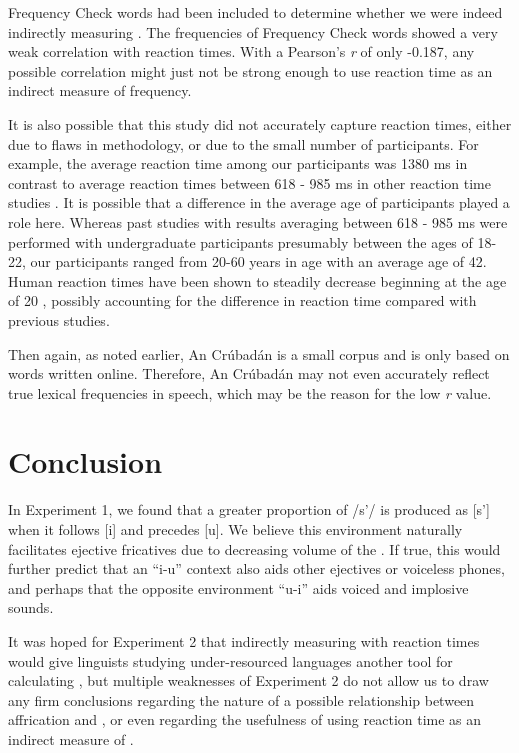 \documentclass[output=paper
,newtxmath
,modfonts
,nonflat]{langsci/langscibook}
\begin{document}
Frequency Check words had been included to determine whether we were indeed indirectly measuring . The frequencies of Frequency Check words showed a very weak correlation with reaction times. With a Pearson’s \textit{r} of only -0.187, any possible correlation might just not be strong enough to use reaction time as an indirect measure of frequency. 

It is also possible that this study did not accurately capture reaction times, either due to flaws in methodology, or due to the small number of participants. For example, the average reaction time among our participants was 1380 ms in contrast to average reaction times between 618 - 985 ms in other reaction time studies \citep{brysbaert2011word}. It is possible that a difference in the average age of participants played a role here. Whereas past studies with results averaging between 618 - 985 ms were performed with undergraduate participants presumably between the ages of 18-22, our participants ranged from 20-60 years in age with an average age of 42. Human reaction times have been shown to steadily decrease beginning at the age of 20 \citep{pierson1958movement}, possibly accounting for the difference in reaction time compared with previous studies.

Then again, as noted earlier, An Crúbadán is a small corpus and is only based on words written online. Therefore, An Crúbadán may not even accurately reflect true lexical frequencies in speech, which may be the reason for the low \textit{r} value.

\section{Conclusion}\label{sec:moeng:7}

In Experiment 1, we found that a greater proportion of /s’/ is produced as [s’] when it follows [i] and precedes [u]. We believe this environment naturally facilitates ejective fricatives due to decreasing volume of the . If true, this would further predict that an “i-u” context also aids other ejectives or voiceless phones, and perhaps that the opposite environment “u-i” aids voiced and implosive sounds.

It was hoped for Experiment 2 that indirectly measuring  with reaction times would give linguists studying under-resourced languages another tool for calculating , but multiple weaknesses of Experiment 2 do not allow us to draw any firm conclusions regarding the nature of a possible relationship between affrication and , or even regarding the usefulness of using reaction time as an indirect measure of . 
\end{document}
